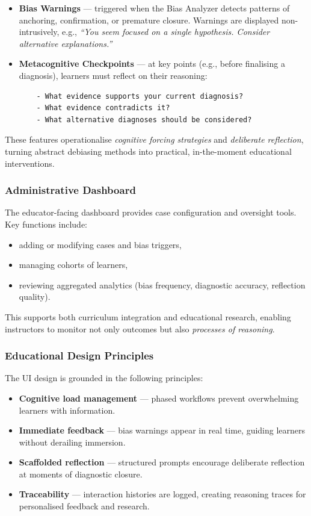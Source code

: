 \begin{itemize}
    \item \textbf{Bias Warnings} — triggered when the Bias Analyzer detects
    patterns of anchoring, confirmation, or premature closure. Warnings are
    displayed non-intrusively, e.g., \textit{``You seem focused on a single
    hypothesis. Consider alternative explanations.''}
    \item \textbf{Metacognitive Checkpoints} — at key points (e.g., before
    finalising a diagnosis), learners must reflect on their reasoning:
    \begin{verbatim}
    - What evidence supports your current diagnosis?
    - What evidence contradicts it?
    - What alternative diagnoses should be considered?
    \end{verbatim}
\end{itemize}

These features operationalise \emph{cognitive forcing strategies} and
\emph{deliberate reflection}, turning abstract debiasing methods into
practical, in-the-moment educational interventions.

\subsubsection{Administrative Dashboard}

The educator-facing dashboard provides case configuration and oversight tools.
Key functions include:
\begin{itemize}
    \item adding or modifying cases and bias triggers,
    \item managing cohorts of learners,
    \item reviewing aggregated analytics (bias frequency, diagnostic accuracy,
    reflection quality).
\end{itemize}

This supports both curriculum integration and educational research, enabling
instructors to monitor not only outcomes but also \emph{processes of reasoning}.

\subsubsection{Educational Design Principles}

The UI design is grounded in the following principles:

\begin{itemize}
    \item \textbf{Cognitive load management} — phased workflows prevent
    overwhelming learners with information.
    \item \textbf{Immediate feedback} — bias warnings appear in real time,
    guiding learners without derailing immersion.
    \item \textbf{Scaffolded reflection} — structured prompts encourage deliberate
    reflection at moments of diagnostic closure.
    \item \textbf{Traceability} — interaction histories are logged, creating
    reasoning traces for personalised feedback and research.
\end{itemize}

